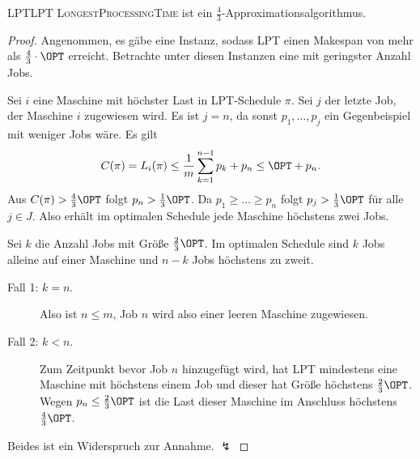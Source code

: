 \documentclass[language=ngerman,algolist]{TemplateLecture}
\begin{document}
\begin{algorithm}
    \caption{\textsc{LongestProcessingTime} (LPT)}
    \begin{algorithmic}[1]
    \end{algorithmic}
\end{algorithm}
\begin{thm}{LPT}{LPT}
    \textsc{LongestProcessingTime} ist ein $\frac{4}{3}$-Approximationsalgorithmus.
\end{thm}
\begin{proof}
    Angenommen, es gäbe eine Instanz, sodass LPT einen Makespan von mehr als $\frac{4}{3} \cdot \OPT$ erreicht. Betrachte unter diesen Instanzen eine mit geringster Anzahl Jobs.
    
    Sei $i$ eine Maschine mit höchster Last in LPT-Schedule $\pi$. Sei $j$ der letzte Job, der Maschine $i$ zugewiesen wird. Es ist $j = n$, da sonst $p_1, \ldots, p_j$ ein Gegenbeispiel mit weniger Jobs wäre. Es gilt 
    \begin{equation*}
        C(\pi) = L_i(\pi) \leq \frac{1}{m}\sum_{k=1}^{n-1} p_k + p_n \leq \OPT + p_n.
    \end{equation*}
    Aus $C(\pi) > \frac{4}{3}\OPT$ folgt $p_n > \frac{1}{3}\OPT$. Da $p_1 \geq \dots \geq p_n$ folgt $p_j > \frac{1}{3}\OPT$ für alle $j \in J$. Also erhält im optimalen Schedule jede Maschine höchstens zwei Jobs. 
    
    Sei $k$ die Anzahl Jobs mit Größe $\frac{2}{3}\OPT$. Im optimalen Schedule sind $k$ Jobs alleine auf einer Maschine und $n-k$ Jobs höchstens zu zweit. 

    \begin{description}
        \item[Fall 1: $k = n$.] Also ist $n \leq m$, Job $n$ wird also einer leeren Maschine zugewiesen. 
        \item[Fall 2: $k < n$.] Zum Zeitpunkt bevor Job $n$ hinzugefügt wird, hat LPT mindestens eine Maschine mit höchstens einem Job und dieser hat Größe höchstens $\frac{2}{3}\OPT$. Wegen $p_n \leq \frac{2}{3}\OPT$ ist die Last dieser Maschine im Anschluss höchstens $\frac{4}{3}\OPT$.
    \end{description}
    Beides ist ein Widerspruch zur Annahme. $\lightning$
\end{proof}
\end{document}
